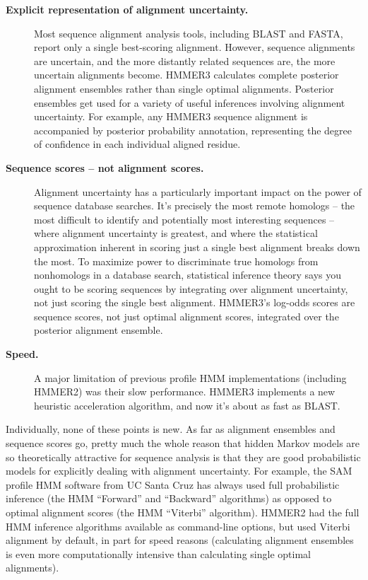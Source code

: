 \begin{description}
\item[\textbf{Explicit representation of alignment uncertainty.}]
  Most sequence alignment analysis tools, including BLAST and FASTA,
  report only a single best-scoring alignment. However, sequence
  alignments are uncertain, and the more distantly related sequences
  are, the more uncertain alignments become. HMMER3 calculates
  complete posterior alignment ensembles rather than single optimal
  alignments. Posterior ensembles get used for a variety of useful
  inferences involving alignment uncertainty. For example, any HMMER3
  sequence alignment is accompanied by posterior probability
  annotation, representing the degree of confidence in each individual
  aligned residue.

\item[\textbf{Sequence scores -- not alignment scores.}]  Alignment
  uncertainty has a particularly important impact on the power of
  sequence database searches.  It's precisely the most remote homologs
  -- the most difficult to identify and potentially most interesting
  sequences -- where alignment uncertainty is greatest, and where the
  statistical approximation inherent in scoring just a single best
  alignment breaks down the most. To maximize power to discriminate
  true homologs from nonhomologs in a database search, statistical
  inference theory says you ought to be scoring sequences by
  integrating over alignment uncertainty, not just scoring the single
  best alignment. HMMER3's log-odds scores are sequence scores, not
  just optimal alignment scores, integrated over the posterior
  alignment ensemble.
  
\item[\textbf{Speed.}] A major limitation of previous profile HMM
  implementations (including HMMER2) was their slow
  performance. HMMER3 implements a new heuristic acceleration
  algorithm, and now it's about as fast as BLAST.
\end{description}

Individually, none of these points is new. As far as alignment
ensembles and sequence scores go, pretty much the whole reason that
hidden Markov models are so theoretically attractive for sequence
analysis is that they are good probabilistic models for explicitly
dealing with alignment uncertainty. For example, the SAM profile HMM
software from UC Santa Cruz has always used full probabilistic
inference (the HMM ``Forward'' and ``Backward'' algorithms) as opposed
to optimal alignment scores (the HMM ``Viterbi'' algorithm). HMMER2
had the full HMM inference algorithms available as command-line
options, but used Viterbi alignment by default, in part for speed
reasons (calculating alignment ensembles is even more computationally
intensive than calculating single optimal alignments).


